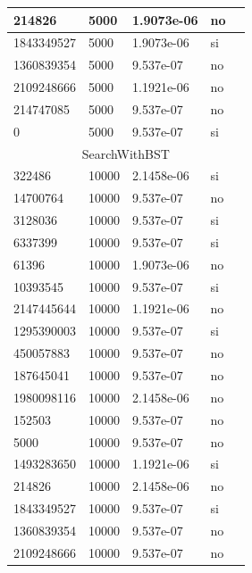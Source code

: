 \documentclass[12pt, fleqn]{article}                             %
\theoremstyle{break}                                            %
\begin{document}
\begin{longtable}{|m{5em}|m{5em}|m{10em}|m{5em}|@{}m{0pt}@{}}
            214826& 5000  & 1.9073e-06 & no &\\[1em]    \hline
            1843349527& 5000  & 1.9073e-06 & si &\\[1em]    \hline
            1360839354& 5000  & 9.537e-07 & no &\\[1em]    \hline
            2109248666& 5000  & 1.1921e-06 & no &\\[1em]    \hline
            214747085& 5000  & 9.537e-07 & no &\\[1em]    \hline
            0& 5000  & 9.537e-07 & si &\\[1em]    \hline
            \multicolumn{5}{|c|}{SearchWithBST}   \\          \hline
            322486& 10000  & 2.1458e-06 & si &\\[1em]    \hline
            14700764& 10000  & 9.537e-07 & no &\\[1em]    \hline
            3128036& 10000  & 9.537e-07 & si &\\[1em]    \hline
            6337399& 10000  & 9.537e-07 & si &\\[1em]    \hline
            61396& 10000  & 1.9073e-06 & no &\\[1em]    \hline
            10393545& 10000  & 9.537e-07 & si &\\[1em]    \hline
            2147445644& 10000  & 1.1921e-06 & no &\\[1em]    \hline
            1295390003& 10000  & 9.537e-07 & si &\\[1em]    \hline
            450057883& 10000  & 9.537e-07 & no &\\[1em]    \hline
            187645041& 10000  & 9.537e-07 & no &\\[1em]    \hline
            1980098116& 10000  & 2.1458e-06 & no &\\[1em]    \hline
            152503& 10000  & 9.537e-07 & no &\\[1em]    \hline
            5000& 10000  & 9.537e-07 & no &\\[1em]    \hline
            1493283650& 10000  & 1.1921e-06 & si &\\[1em]    \hline
            214826& 10000  & 2.1458e-06 & no &\\[1em]    \hline
            1843349527& 10000  & 9.537e-07 & si &\\[1em]    \hline
            1360839354& 10000  & 9.537e-07 & no &\\[1em]    \hline
            2109248666& 10000  & 9.537e-07 & no &\\[1em]    \hline

\end{longtable}
\end{document}
